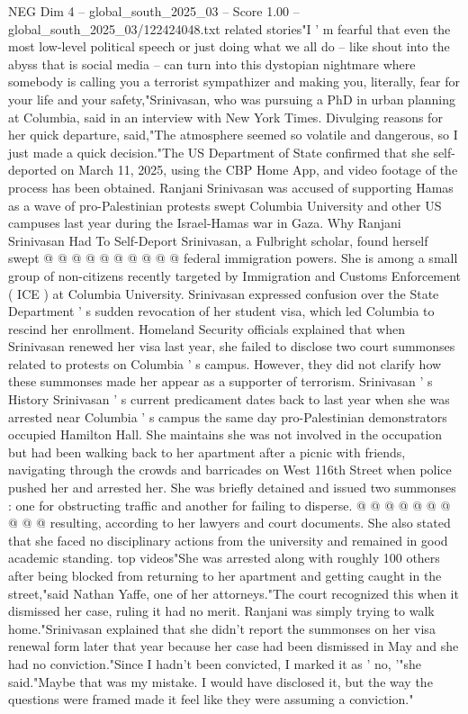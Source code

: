\begin{textsample}{NEG Dim 4 – global\_south\_2025\_03 – Score 1.00 – global\_south\_2025\_03/122424048.txt}  \label{ex:f4_neg_425}
related stories"I ' m fearful that even the most low-level political speech or just doing what we all do -- like shout into the abyss that is social media -- can turn into this dystopian nightmare where somebody is calling you a terrorist sympathizer and making you, literally, fear for your life and your safety,"Srinivasan, who was pursuing a PhD in urban planning at Columbia, said in an interview with New York Times.
Divulging reasons for her quick departure, said,"The atmosphere seemed so volatile and dangerous, so I just made a quick decision."The US Department of State confirmed that she self-deported on March 11, 2025, using the CBP Home App, and video footage of the process has been obtained.
Ranjani Srinivasan was accused of supporting Hamas as a wave of pro-Palestinian protests swept Columbia University and other US campuses last year during the Israel-Hamas war in Gaza.
Why Ranjani Srinivasan Had To Self-Deport Srinivasan, a Fulbright scholar, found herself swept @ @ @ @ @ @ @ @ @ @ federal immigration powers.
She is among a small group of non-citizens recently targeted by Immigration and Customs Enforcement ( ICE ) at Columbia University.
Srinivasan expressed confusion over the State Department ' s sudden revocation of her student visa, which led Columbia to rescind her enrollment.
Homeland Security officials explained that when Srinivasan renewed her visa last year, she failed to disclose two court summonses related to protests on Columbia ' s campus.
However, they did not clarify how these summonses made her appear as a supporter of terrorism.
Srinivasan ' s History Srinivasan ' s current predicament dates back to last year when she was arrested near Columbia ' s campus the same day pro-Palestinian demonstrators occupied Hamilton Hall.
She maintains she was not involved in the occupation but had been walking back to her apartment after a picnic with friends, navigating through the crowds and barricades on West 116th Street when police pushed her and arrested her.
She was briefly detained and issued two summonses : one for obstructing traffic and another for failing to disperse. @ @ @ @ @ @ @ @ @ @ resulting, according to her lawyers and court documents.
She also stated that she faced no disciplinary actions from the university and remained in good academic standing. top videos"She was arrested along with roughly 100 others after being blocked from returning to her apartment and getting caught in the street,"said Nathan Yaffe, one of her attorneys."The court recognized this when it dismissed her case, ruling it had no merit.
Ranjani was simply trying to walk home."Srinivasan explained that she didn't report the summonses on her visa renewal form later that year because her case had been dismissed in May and she had no conviction."Since I hadn't been convicted, I marked it as ' no, '"she said."Maybe that was my mistake.
I would have disclosed it, but the way the questions were framed made it feel like they were assuming a conviction."

\end{textsample}
